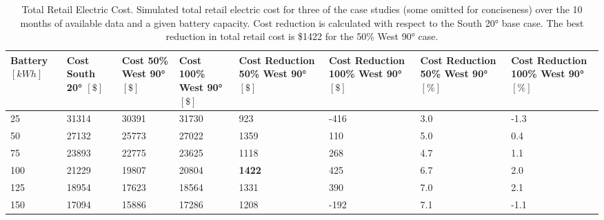 \documentclass[journal,article,submit,pdftex,moreauthors]{Definitions/mdpi}
\begin{document}
\begin{table}[!h]
  \centering
  \caption{Total Retail Electric Cost. Simulated total retail electric cost for three of the case studies (some omitted for conciseness) over the 10 months of available data and a given battery capacity. Cost reduction is calculated with respect to the South 20° base case. The best reduction in total retail cost is \$1422 for the 50\% West 90° case.}
  \label{tab:total-cost}
  \begin{tabularx}{\textwidth}{XXXXXXXX}
    \toprule
    Battery $[kWh]$ & Cost South 20° $[\$]$ & Cost 50\% West 90° $[\$]$ & Cost 100\% West 90° $[\$]$ & Cost Reduction 50\% West 90° $[\$]$ & Cost Reduction 100\% West 90° $[\$]$ & Cost Reduction 50\% West 90° $[\%]$ & Cost Reduction 100\% West 90° $[\%]$ \\
    \midrule
    25              & 31314                 & 30391                     & 31730                      & 923                                 & -416                                 & 3.0                                 & -1.3                                 \\
    50              & 27132                 & 25773                     & 27022                      & 1359                                & 110                                  & 5.0                                 & 0.4                                  \\
    75              & 23893                 & 22775                     & 23625                      & 1118                                & 268                                  & 4.7                                 & 1.1                                  \\
    100             & 21229                 & 19807                     & 20804                      & \textbf{1422}                       & 425                                  & 6.7                                 & 2.0                                  \\
    125             & 18954                 & 17623                     & 18564                      & 1331                                & 390                                  & 7.0                                 & 2.1                                  \\
    150             & 17094                 & 15886                     & 17286                      & 1208                                & -192                                 & 7.1                                 & -1.1                                 \\

\end{tabularx}
\end{table}
\end{document}
